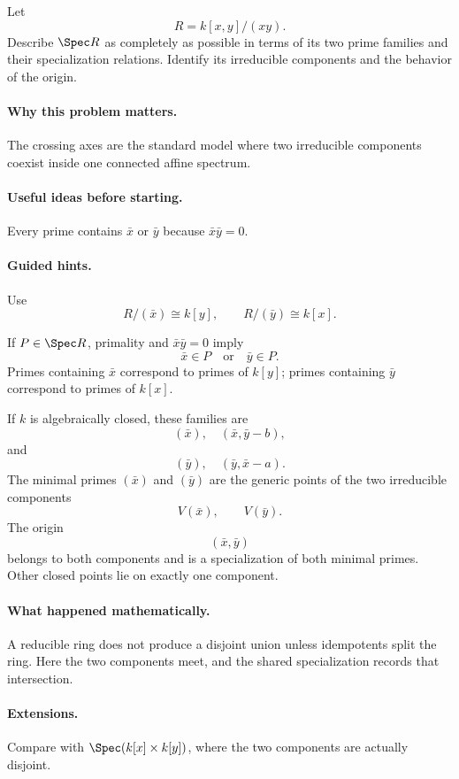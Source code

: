 \begin{problem}
Let
\[
R=k[x,y]/(xy).
\]
Describe $\Spec R$ as completely as possible in terms of its two prime families and their
specialization relations.  Identify its irreducible components and the behavior of the
origin.
\end{problem}

\paragraph{Why this problem matters.}
The crossing axes are the standard model where two irreducible components coexist inside
one connected affine spectrum.

\paragraph{Useful ideas before starting.}
Every prime contains $\bar x$ or $\bar y$ because $\bar x\bar y=0$.

\paragraph{Guided hints.}
Use
\[
R/(\bar x)\cong k[y],
\qquad
R/(\bar y)\cong k[x].
\]

\begin{solution}
If $P\in\Spec R$, primality and $\bar x\bar y=0$ imply
\[
\bar x\in P\quad\text{or}\quad\bar y\in P.
\]
Primes containing $\bar x$ correspond to primes of $k[y]$; primes containing $\bar y$
correspond to primes of $k[x]$.

If $k$ is algebraically closed, these families are
\[
(\bar x),\quad(\bar x,\bar y-b),
\]
and
\[
(\bar y),\quad(\bar y,\bar x-a).
\]
The minimal primes $(\bar x)$ and $(\bar y)$ are the generic points of the two irreducible
components
\[
V(\bar x),\qquad V(\bar y).
\]
The origin
\[
(\bar x,\bar y)
\]
belongs to both components and is a specialization of both minimal primes.  Other closed
points lie on exactly one component.
\end{solution}

\paragraph{What happened mathematically.}
A reducible ring does not produce a disjoint union unless idempotents split the ring.
Here the two components meet, and the shared specialization records that intersection.

\paragraph{Extensions.}
Compare with $\Spec(k[x]\times k[y])$, where the two components are actually disjoint.
